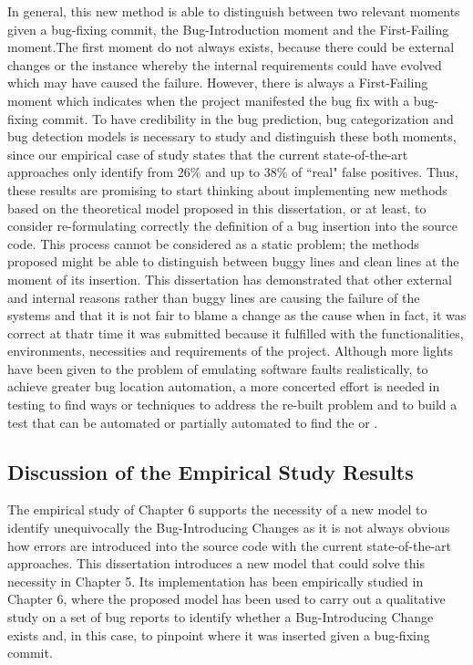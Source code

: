 \documentclass[a4paper, 12pt]{book}
\begin{document}
	
In general, this new method is able to distinguish between two relevant moments given a bug-fixing commit, the Bug-Introduction moment and the First-Failing moment.The first moment do not always exists, because there could be external changes or the instance whereby the internal requirements could have evolved which may have caused the failure. However, there is always a First-Failing moment which indicates when the project manifested the bug fix with a bug-fixing commit. To have credibility in the bug prediction, bug categorization and bug detection models is necessary to study and distinguish these both moments, since our empirical case of study states that the current state-of-the-art approaches only identify from 26\% and up to 38\% of ``real" false positives. Thus, these results are promising to start thinking about implementing new methods based on the theoretical model proposed in this dissertation, or at least, to consider re-formulating correctly the definition of  a bug insertion into the source code. This process cannot be considered as a static problem; the methods proposed might be able to distinguish between buggy lines and clean lines at the moment of its insertion. This dissertation has demonstrated that other external and internal reasons rather than buggy lines are causing the failure of the systems and that it is not fair to blame a change as the cause when in fact, it was correct at thatr time it was submitted because it fulfilled with the functionalities, environments, necessities and requirements of the project. Although more  lights have been given to the problem of emulating software faults realistically, to achieve greater bug location automation, a more concerted effort is needed in testing to find ways or techniques to address the re-built problem and to build a test that can be automated or partially automated to find the \BIC or \FFC.

\subsection{Discussion of the Empirical Study Results}

The empirical study of Chapter 6 supports the necessity of a new model to identify unequivocally the Bug-Introducing Changes as it is not always obvious how errors are introduced into the source code with the current state-of-the-art approaches. This dissertation introduces a new model that could solve this necessity in Chapter 5. Its implementation has been empirically studied in Chapter 6, where the proposed model has been used to carry out a qualitative study on a set of bug reports to identify whether a Bug-Introducing Change exists and, in this case, to pinpoint where it was inserted given a bug-fixing commit.  
\end{document}
